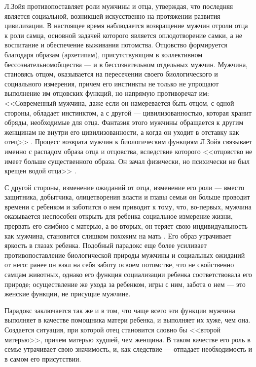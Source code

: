 \documentclass{../../common/thesisbyxetex}
\begin{document}
Л.Зойя противопоставляет роли мужчины и отца, утверждая, что последняя является социальной, 
возникшей искусственно на протяжении развития цивилизации. В настоящее время наблюдается 
возвращение мужчин отроли отца к роли самца, основной задачей которого является оплодотворение 
самки, а не воспитание и обеспечение выживания потомства. Отцовство формируется благодаря 
образам (архетипам), присутствующим в коллективном бессознательномобщества --- и в 
бессознательном отдельных мужчин. Мужчина, становясь отцом, оказывается на пересечении 
своего биологического и социального измерения, причем его инстинкты не только не упрощают 
выполнение им отцовских функций, но напрямую противоречат им: <<Современный мужчина, даже 
если он намеревается быть отцом, с одной стороны, обладает инстинктом, а с другой --- 
цивилизованностью, которая хранит обряды, необходимые для отца. Фантазия этого мужчины 
обращается к другим женщинам не внутри его цивилизованности, а когда он уходит в отставку 
как отец>> \cite[270]{zo}. Процесс возврата мужчин к биологическим функциям Л.Зойя связывает 
именно с распадом образа отца и отцовства, вследствие которого <<отцовство не имеет больше 
существенного образа. Он зачал физически, но психически не был крещен водой отца>> \cite[270]{zo}.

С другой стороны, изменение ожиданий от отца, изменение его роли --- вместо защитника, добытчика, 
олицетворения власти и главы семьи он больше проводит времени с ребенком и заботится о нем 
приводит к тому, что, во-первых, мужчина оказывается неспособен открыть для ребенка социальное 
измерение жизни, прервать его симбиоз с матерью, а во-вторых, он теряет свою индивидуальность как 
мужчина, становится слишком похожим на мать \cite[285]{zo}. Его образ утрачивает 
яркость в глазах ребенка. Подобный парадокс еще более усиливает противопоставление биологической 
природы мужчины и социальных ожиданий от него: ранее он взял на себя заботу освоем потомстве, что 
не свойственно самцам животных, однако его функция социализации ребенка соответствовала его 
природе; осуществление же ухода за ребенком, игры  с ним, забота о нем --- это женские функции, не 
присущие мужчине.

Парадокс заключается так же и в том, что чаще всего эти функции мужчина выполняет в качестве 
помощника матери ребенка, и выполняет их хуже, чем она. Создается ситуация, при 
которой отец становится словно бы <<второй матерью>>, причем матерью худшей, чем женщина. В таком 
качестве его роль в семье утрачивает свою значимость, и, как следствие --- отпадает 
необходимость и в самом его присутствии.
\end{document}
